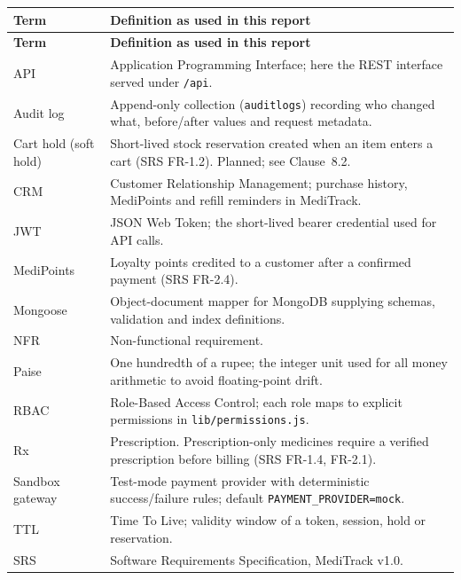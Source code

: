 \documentclass[11pt,a4paper]{article}
\begin{document}
{\footnotesize
\begin{longtable}{@{}L{3.30cm}L{12.42cm}@{}}
\toprule
\textbf{Term} & \textbf{Definition as used in this report}\\
\midrule
\endfirsthead
\toprule
\textbf{Term} & \textbf{Definition as used in this report}\\
\midrule
\endhead
\bottomrule
\endlastfoot
API & Application Programming Interface; here the REST interface served under \texttt{/api}.\\
Audit log & Append-only collection (\texttt{auditlogs}) recording who changed what, before/after values and request metadata.\\
Cart hold (soft hold) & Short-lived stock reservation created when an item enters a cart (SRS FR-1.2). Planned; see Clause~8.2.\\
CRM & Customer Relationship Management; purchase history, MediPoints and refill reminders in MediTrack.\\
JWT & JSON Web Token; the short-lived bearer credential used for API calls.\\
MediPoints & Loyalty points credited to a customer after a confirmed payment (SRS FR-2.4).\\
Mongoose & Object-document mapper for MongoDB supplying schemas, validation and index definitions.\\
NFR & Non-functional requirement.\\
Paise & One hundredth of a rupee; the integer unit used for all money arithmetic to avoid floating-point drift.\\
RBAC & Role-Based Access Control; each role maps to explicit permissions in \mbox{\texttt{lib/permissions.js}}.\\
Rx & Prescription. Prescription-only medicines require a verified prescription before billing (SRS FR-1.4, FR-2.1).\\
Sandbox gateway & Test-mode payment provider with deterministic success/failure rules; default \texttt{PAYMENT\_PROVIDER=mock}.\\
TTL & Time To Live; validity window of a token, session, hold or reservation.\\
SRS & Software Requirements Specification, MediTrack v1.0.\\
\end{longtable}
}
\end{document}
